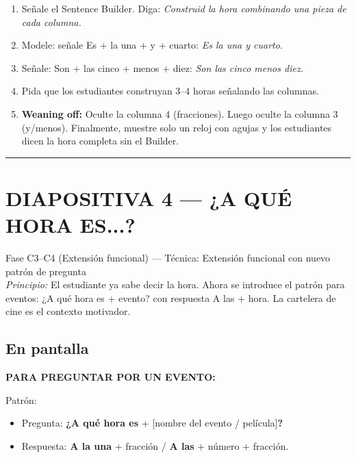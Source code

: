 \documentclass[a4paper,11pt]{article}
\begin{document}
\begin{enumerate}[leftmargin=1.5cm, itemsep=4pt]
\item Señale el Sentence Builder. Diga: \textit{Construid la hora combinando una pieza de cada columna.}
\item Modele: señale Es + la una + y + cuarto: \textit{Es la una y cuarto.}
\item Señale: Son + las cinco + menos + diez: \textit{Son las cinco menos diez.}
\item Pida que los estudiantes construyan 3--4 horas señalando las columnas.
\item \textbf{Weaning off:} Oculte la columna 4 (fracciones). Luego oculte la columna 3 (y/menos). Finalmente, muestre solo un reloj con agujas y los estudiantes dicen la hora completa sin el Builder.
\end{enumerate}

\newpage


\noindent\textcolor{violeta}{\rule{\linewidth}{2.5pt}}

\section*{DIAPOSITIVA 4 — ¿A QUÉ HORA ES...?}

{\small Fase C3--C4 (Extensión funcional) — Técnica: Extensión funcional con nuevo patrón de pregunta}\\
{\small\textit{Principio:} El estudiante ya sabe decir la hora. Ahora se introduce el patrón para eventos: ¿A qué hora es + evento? con respuesta A las + hora. La cartelera de cine es el contexto motivador.}

\vspace{0.5cm}

\subsection*{En pantalla}

\begin{center}
{\Large\textbf{PARA PREGUNTAR POR UN EVENTO:}}
\end{center}

\vspace{0.3cm}

Patrón:
\begin{itemize}[leftmargin=2cm, itemsep=3pt]
\item Pregunta: \textbf{¿A qué hora es} + [nombre del evento / película]\textbf{?}
\item Respuesta: \textbf{A la una} + fracción / \textbf{A las} + número + fracción.
\end{itemize}
\end{document}
